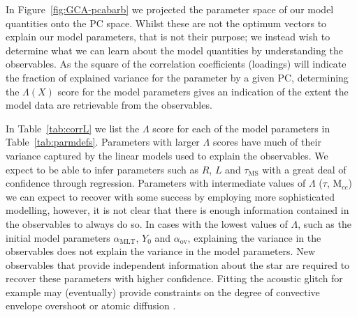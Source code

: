 In Figure~\ref{fig:GCA-pcabarb} we projected the parameter space of our model quantities onto the PC space.  Whilst these are not the optimum vectors to explain our model parameters, that is not their purpose; we instead wish to determine what we can learn about the model quantities by understanding the observables. 
As the square of the correlation coefficients (loadings) will indicate the fraction of explained variance for the parameter by a given PC, determining the  
$\Lambda(X)$ score for the model parameters gives an indication of the extent the model data are retrievable from the observables.  

In Table~\ref{tab:corrL} we list the $\Lambda$ score for each of the model parameters in Table~\ref{tab:parmdefs}. Parameters with larger $\Lambda$ scores have much of their variance captured by the linear models used to explain the observables.  We expect  to be able to infer parameters such as $R$, $L$ and $\tau_{\text{MS}}$ with a great deal of confidence through regression. 
Parameters with intermediate values of $\Lambda$ ($\tau$, M$_{cc}$) we can expect to recover with some success by employing more sophisticated modelling, however, it is not clear that there is enough information contained in the observables to always do so. In cases with the lowest values of $\Lambda$, such as the initial model parameters $\alpha_{\text{MLT}}$, $Y_0$ and $\alpha_{\text{ov}}$, explaining the variance in the observables does not explain the variance in the model parameters. New observables that provide independent information about the star are required to recover these parameters with higher confidence. Fitting the acoustic glitch for example may (eventually) provide constraints on the degree of convective envelope overshoot or atomic diffusion \citep{2017ApJ...837...47V}. 



